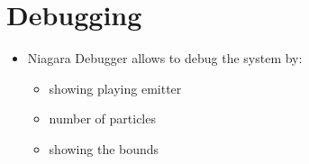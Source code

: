    \section{Debugging}
        \begin{itemize}
            \item Niagara Debugger allows to debug the system by:
            \begin{itemize}
                \item showing playing emitter 
                \item number of particles
                \item showing the bounds
            \end{itemize}
        \end{itemize}
 
